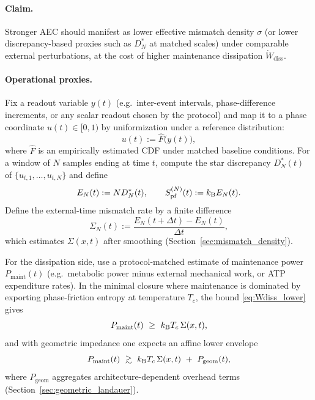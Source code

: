 \paragraph{Claim.}
Stronger AEC should manifest as lower effective mismatch density $\sigma$ (or lower discrepancy-based proxies such as $D_N^\ast$ at matched scales) under comparable external perturbations, at the cost of higher maintenance dissipation $\dot W_{\mathrm{diss}}$.

\paragraph{Operational proxies.}
Fix a readout variable $y(t)$ (e.g.\ inter-event intervals, phase-difference increments, or any scalar readout chosen by the protocol) and map it to a phase coordinate $u(t)\in[0,1)$ by uniformization under a reference distribution:
\begin{equation}
  u(t) := \widehat{F}\bigl(y(t)\bigr),
  \label{eq:u_uniformization}
\end{equation}
where $\widehat{F}$ is an empirically estimated CDF under matched baseline conditions.
For a window of $N$ samples ending at time $t$, compute the star discrepancy $D_N^\ast(t)$ of $\{u_{t,1},\dots,u_{t,N}\}$ and define
\begin{equation}
  E_N(t):=N D_N^\ast(t),\qquad S_{\mathrm{pf}}^{(N)}(t):=k_{\mathrm{B}} E_N(t).
\end{equation}
Define the external-time mismatch rate by a finite difference
\begin{equation}
  \Sigma_N(t) := \frac{E_N(t+\Delta t)-E_N(t)}{\Delta t},
  \label{eq:SigmaN_def}
\end{equation}
which estimates $\Sigma(x,t)$ after smoothing (Section~\ref{sec:mismatch_density}).

For the dissipation side, use a protocol-matched estimate of maintenance power $P_{\mathrm{maint}}(t)$ (e.g.\ metabolic power minus external mechanical work, or ATP expenditure rates). In the minimal closure where maintenance is dominated by exporting phase-friction entropy at temperature $T_c$, the bound \eqref{eq:Wdiss_lower} gives
\begin{equation}
  P_{\mathrm{maint}}(t)\ \ge\ k_{\mathrm{B}} T_c\,\Sigma(x,t),
  \label{eq:Pmaint_lower}
\end{equation}
and with geometric impedance one expects an affine lower envelope
\begin{equation}
  P_{\mathrm{maint}}(t)\ \gtrsim\ k_{\mathrm{B}} T_c\,\Sigma(x,t)\ +\ P_{\mathrm{geom}}(t),
  \label{eq:Pmaint_affine}
\end{equation}
where $P_{\mathrm{geom}}$ aggregates architecture-dependent overhead terms (Section~\ref{sec:geometric_landauer}).

